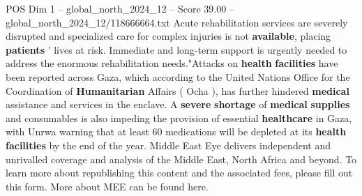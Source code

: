\begin{textsample}{POS Dim 1 – global\_north\_2024\_12 – Score 39.00 – global\_north\_2024\_12/118666664.txt}
Acute rehabilitation services are severely disrupted and specialized care for complex injuries is not \textbf{available}, placing \textbf{patients} ' lives at risk.
Immediate and long-term support is urgently needed to address the enormous rehabilitation needs."Attacks on \textbf{health} \textbf{facilities} have been reported across Gaza, which according to the United Nations Office for the Coordination of \textbf{Humanitarian} Affairs ( Ocha ), has further hindered \textbf{medical} assistance and services in the enclave.
A \textbf{severe} \textbf{shortage} of \textbf{medical} \textbf{supplies} and consumables is also impeding the provision of essential \textbf{healthcare} in Gaza, with Unrwa warning that at least 60 medications will be depleted at its \textbf{health} \textbf{facilities} by the end of the year.
Middle East Eye delivers independent and unrivalled coverage and analysis of the Middle East, North Africa and beyond.
To learn more about republishing this content and the associated fees, please fill out this form.
More about MEE can be found here.

\end{textsample}
